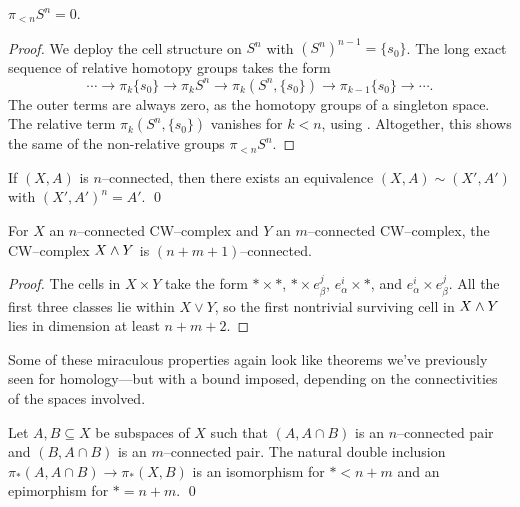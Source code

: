 \begin{corollary}
$\pi_{< n} S^n = 0$.
\end{corollary}
\begin{proof}
We deploy the cell structure on $S^n$ with $(S^n)^{n-1} = \{s_0\}$.
The long exact sequence of relative homotopy groups takes the form \[\cdots \to \pi_k \{s_0\} \to \pi_k S^n \to \pi_k (S^n, \{s_0\}) \to \pi_{k-1} \{s_0\} \to \cdots.\]
The outer terms are always zero, as the homotopy groups of a singleton space.
The relative term $\pi_k (S^n, \{s_0\})$ vanishes for $k < n$, using .
Altogether, this shows the same of the non-relative groups $\pi_{<n} S^n$.
\end{proof}

\begin{lemma}\label{NConnectedSpacesHaveSmallModels}%
If $(X, A)$ is $n$--connected, then there exists an equivalence $(X, A) \sim (X', A')$ with $(X', A')^n = A'$. \qed
{}
\end{lemma}

\begin{corollary}
For $X$ an $n$--connected CW--complex and $Y$ an $m$--connected CW--complex, the CW--complex $X \wedge Y$ is $(n+m+1)$--connected.
\end{corollary}
\begin{proof}
The cells in $X \times Y$ take the form $* \times *$, $* \times e_\beta^j$, $e_\alpha^i \times *$, and $e_\alpha^i \times e_\beta^j$.
All the first three classes lie within $X \vee Y$, so the first nontrivial surviving cell in $X \wedge Y$ lies in dimension at least $n + m + 2$.
\end{proof}

\noindent Some of these miraculous properties again look like theorems we've previously seen for homology---but with a bound imposed, depending on the connectivities of the spaces involved.

\begin{theorem}\label{HomotopyExcision}%
Let $A, B \subseteq X$ be subspaces of $X$ such that $(A, A \cap B)$ is an $n$--connected pair and $(B, A \cap B)$ is an $m$--connected pair.
The natural double inclusion $\pi_*(A, A \cap B) \to \pi_*(X, B)$ is an isomorphism for $* < n+m$ and an epimorphism for $* = n+m$. \qed
\end{theorem}

